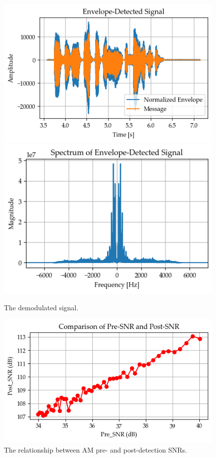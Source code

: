\documentclass[../ECE459FinalProjectReport.tex]{subfiles}
\begin{document}
\begin{figure}[tb]
    \centering
    \includegraphics[width=0.49\linewidth]{plots/am/detected_time.png}
    \includegraphics[width=0.49\linewidth]{plots/am/detected_spectrum.png}
    \caption{The demodulated signal.}
    \label{fig:am-demodulated}
\end{figure}
\begin{figure}[tb]
    \centering
    \includegraphics[width=0.6\linewidth]{plots/am/am_snr_relation.png}
    \caption{The relationship between AM pre- and post-detection SNRs.}
    \label{fig:am-snr-relation}
\end{figure}
\end{document}
